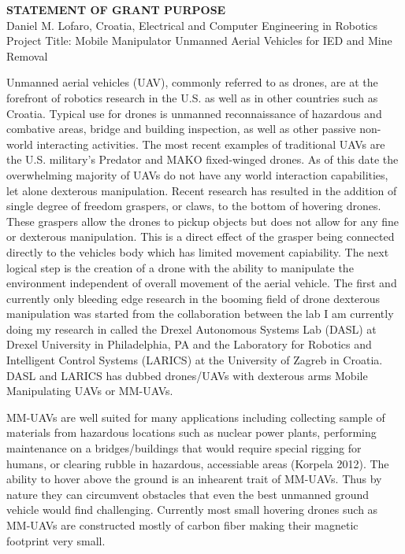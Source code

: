 \documentclass[12pt]{article}
\begin{document}
\begin{center}
\textbf{STATEMENT OF GRANT PURPOSE}\\
Daniel M. Lofaro, Croatia, Electrical and Computer Engineering in Robotics\\
Project Title: Mobile Manipulator Unmanned Aerial Vehicles for IED and Mine Removal\\

\end{center}

Unmanned aerial vehicles (UAV), commonly referred to as drones, are at the forefront of robotics research in the U.S. as well as in other countries such as Croatia.  
Typical use for drones is unmanned reconnaissance of hazardous and combative areas, bridge and building inspection, as well as other passive non-world interacting activities.
The most recent examples of traditional UAVs are the U.S. military's Predator and MAKO fixed-winged drones.  
As of this date the overwhelming majority of UAVs do not have any world interaction capabilities, let alone dexterous manipulation.
Recent research has resulted in the addition of single degree of freedom graspers, or claws, to the bottom of hovering drones.
These graspers allow the drones to pickup objects but does not allow for any fine or dexterous manipulation.  
This is a direct effect of the grasper being connected directly to the vehicles body which has limited movement capiability.
The next logical step is the creation of a drone with the ability to manipulate the environment independent of overall movement of the aerial vehicle.  
The first and currently only bleeding edge research in the booming field of drone dexterous manipulation was started from the collaboration between the lab I am currently doing my research in called the Drexel Autonomous Systems Lab (DASL) at Drexel University in Philadelphia, PA and the Laboratory for Robotics and Intelligent Control Systems (LARICS) at the University of Zagreb in Croatia.
DASL and LARICS has dubbed drones/UAVs  with dexterous arms Mobile Manipulating UAVs or MM-UAVs. 

MM-UAVs are well suited for many applications including collecting sample of materials from hazardous locations such as nuclear power plants, performing maintenance on a bridges/buildings that would require special rigging for humans, or clearing rubble in hazardous, accessiable areas (Korpela 2012). 
The ability to hover above the ground is an inhearent trait of MM-UAVs.
Thus by nature they can circumvent obstacles that even the best unmanned ground vehicle would find challenging.  
Currently most small hovering drones such as MM-UAVs are constructed mostly of carbon fiber making their magnetic footprint very small.  
\end{document}
